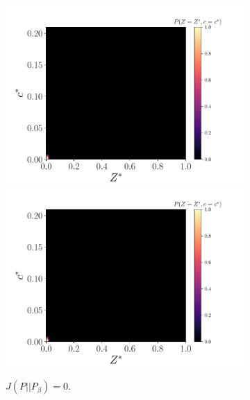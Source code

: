 \documentclass[review]{elsarticle}
\begin{document}
\begin{figure}[!tbp]%
  \centering%
  \begin{subfigure}[t]{0.32\textwidth}%
    \includegraphics[page=3,width=\textwidth]{./figs/pdfs_50429.pdf}\\%
    \includegraphics[page=4,width=\textwidth]{./figs/pdfs_50429.pdf}%
    \caption{$J(P||P_{\beta})=0$.}\label{fig:}%
  \end{subfigure}\hfill%
  \begin{subfigure}[t]{0.32\textwidth}%

\end{subfigure}
\end{figure}
\end{document}
